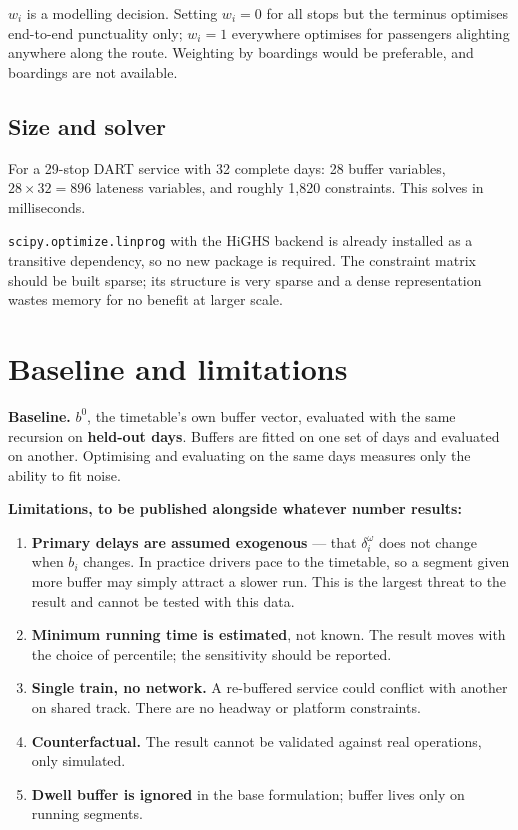 \documentclass[11pt,a4paper]{article}
\newcommand{\code}[1]{\texttt{\small #1}}
\begin{document}
$w_i$ is a modelling decision. Setting $w_i = 0$ for all stops but the terminus optimises
end-to-end punctuality only; $w_i = 1$ everywhere optimises for passengers alighting
anywhere along the route. Weighting by boardings would be preferable, and boardings are not
available.

\subsection*{Size and solver}

For a 29-stop DART service with 32 complete days: 28 buffer variables, $28 \times 32 = 896$
lateness variables, and roughly 1{,}820 constraints. This solves in milliseconds.

\code{scipy.optimize.linprog} with the HiGHS backend is already installed as a transitive
dependency, so no new package is required. The constraint matrix should be built sparse; its
structure is very sparse and a dense representation wastes memory for no benefit at larger
scale.

\section{Baseline and limitations}

\textbf{Baseline.} $b^0$, the timetable's own buffer vector, evaluated with the same
recursion on \textbf{held-out days}. Buffers are fitted on one set of days and evaluated on
another. Optimising and evaluating on the same days measures only the ability to fit noise.

\textbf{Limitations, to be published alongside whatever number results:}

\begin{enumerate}[leftmargin=1.6em,itemsep=0.25em]
  \item \textbf{Primary delays are assumed exogenous} --- that $\delta_i^\omega$ does not
        change when $b_i$ changes. In practice drivers pace to the timetable, so a segment
        given more buffer may simply attract a slower run. This is the largest threat to the
        result and cannot be tested with this data.
  \item \textbf{Minimum running time is estimated}, not known. The result moves with the
        choice of percentile; the sensitivity should be reported.
  \item \textbf{Single train, no network.} A re-buffered service could conflict with another
        on shared track. There are no headway or platform constraints.
  \item \textbf{Counterfactual.} The result cannot be validated against real operations, only
        simulated.
  \item \textbf{Dwell buffer is ignored} in the base formulation; buffer lives only on
        running segments.
\end{enumerate}
\end{document}
